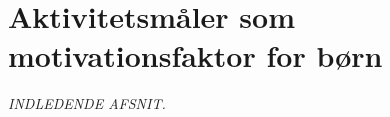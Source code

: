 \section{Aktivitetsmåler som motivationsfaktor for børn}

\textit{INDLEDENDE AFSNIT.} \label{tracker_intro}

